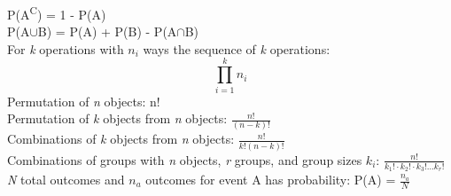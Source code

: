 \documentclass[letter, 12pt]{article}
\begin{document}
\begin{multicols}{2}
P(A\textsuperscript{C}) = 1 - P(A)\\
P(A$\cup$B) = P(A) + P(B) - P(A$\cap$B)\\
For \textit{k} operations with $n_i$ ways the sequence of \textit{k} operations:\\
\begin{displaymath}
\prod_{i=1}^k n_i
\end{displaymath}
Permutation of \textit{n} objects: n!\\
Permutation of \textit{k} objects from \textit{n} objects: $\frac{n!}{(n-k)!}$\\
Combinations of \textit{k} objects from \textit{n} objects: $\frac{n!}{k!(n-k)!}$\\
Combinations of groups with \textit{n} objects, \textit{r} groups, and group sizes $k_i$: $\frac{n!}{k_1!\cdot k_2! \cdot k_3! \ldots k_r!}$\\
\textit{N} total outcomes and $n_a$ outcomes for event A has probability: P(A) = $\frac{n_a}{N}$\\
\end{multicols}
\end{document}
